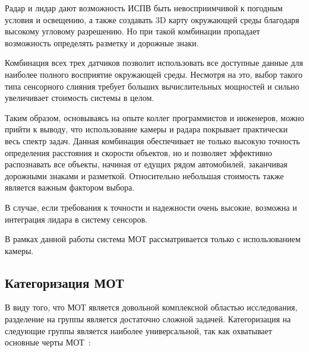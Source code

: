 Радар и лидар дают возможность ИСПВ быть невосприимчивой к погодным условия и освещению, а также создавать 3D карту окружающей среды благодаря высокому угловому разрешению. Но при такой комбинации пропадает возможность определять разметку и дорожные знаки. 

Комбинация всех трех датчиков позволит использовать все доступные данные для наиболее полного восприятие окружающей среды. Несмотря на это, выбор такого типа сенсорного слияния требует больших вычислительных мощностей и сильно увеличивает стоимость системы в целом.

Таким образом, основываясь на опыте коллег программистов и инженеров, можно прийти к выводу, что использование камеры и радара покрывает практически весь спектр задач. Данная комбинация обеспечивает не только высокую точность определения расстояния и скорости объектов, но и позволяет эффективно распознавать все объекты, начиная от едущих рядом автомобилей, заканчивая дорожными знаками и разметкой. Относительно небольшая стоимость также является важным фактором выбора. 

В случае, если требования к точности и надежности очень высокие, возможна и интеграция лидара в систему сенсоров. 

В рамках данной работы система МОТ рассматривается только с использованием камеры.

\subsection{Категоризация МОТ}\label{subsec:MOT_category}

В виду того, что МОТ является довольной комплексной областью исследования, разделение на группы является достаточно сложной задачей. Категоризация на следующие группы является наиболее универсальной, так как охватывает основные черты МОТ~\cite{Article::Luo2021}: 

